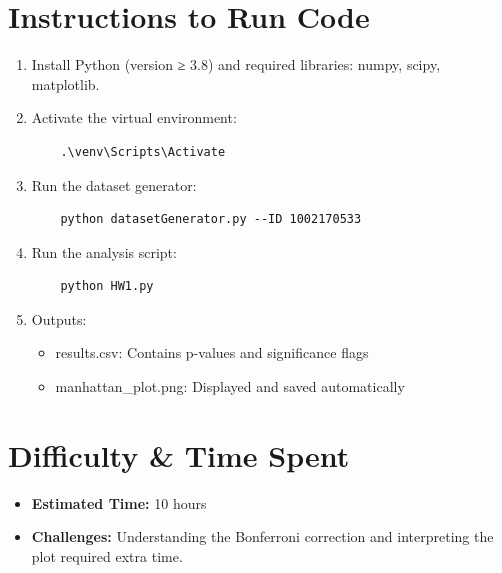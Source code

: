 \documentclass[12pt]{article}
\begin{document}
\section*{Instructions to Run Code}
\begin{enumerate}
  \item Install Python (version ≥ 3.8) and required libraries: numpy, scipy, matplotlib.
  \item Activate the virtual environment:
    \begin{verbatim}
    .\venv\Scripts\Activate
    \end{verbatim}
  \item Run the dataset generator:
    \begin{verbatim}
    python datasetGenerator.py --ID 1002170533
    \end{verbatim}
  \item Run the analysis script:
    \begin{verbatim}
    python HW1.py
    \end{verbatim}
  \item Outputs:
    \begin{itemize}
      \item results.csv: Contains p-values and significance flags
      \item manhattan\_plot.png: Displayed and saved automatically
    \end{itemize}
\end{enumerate}

\section*{Difficulty \& Time Spent}
\begin{itemize}
  \item \textbf{Estimated Time:} 10 hours
  \item \textbf{Challenges:} Understanding the Bonferroni correction and interpreting the plot required extra time.
\end{itemize}
\end{document}
